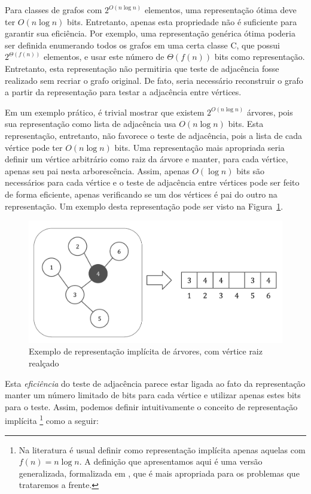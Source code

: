 Para classes de grafos com $2^{O(n\log n)}$ elementos, uma representação ótima deve ter $O(n\log n)$ bits. Entretanto, apenas esta propriedade não é suficiente para garantir sua eficiência. Por exemplo, uma representação genérica ótima poderia ser definida enumerando todos os grafos em uma certa classe C, que possui $2^{\Theta(f(n))}$ elementos, e usar este número de $\Theta(f(n))$ bits como representação. Entretanto, esta representação não permitiria que teste de adjacência fosse realizado sem recriar o grafo original. De fato, seria necessário reconstruir o grafo a partir da representação para testar a adjacência entre vértices.

Em um exemplo prático, é trivial mostrar que existem $2^{O(n\log n)}$ árvores, pois sua representação como lista de adjacência usa $O(n \log n)$ bits. Esta representação, entretanto, não favorece o teste de adjacência, pois a lista de cada vértice pode ter $O(n \log n)$ bits. Uma representação mais apropriada seria definir um vértice arbitrário como raiz da árvore e manter, para cada vértice, apenas seu pai nesta arborescência. Assim, apenas $O(\log n)$ bits são necessários para cada vértice e o teste de adjacência entre vértices pode ser feito de forma eficiente, apenas verificando se um dos vértices é pai do outro na representação. Um exemplo desta representação pode ser visto na Figura~\ref{fig:graphs1}. 

\begin{figure}[!htbp]
  \centering
  \includegraphics[scale=0.6]{files/graphs1.pdf}
  \caption{Exemplo de representação implícita de árvores, com vértice raiz realçado}
  \label{fig:graphs1}
\end{figure}

Esta \emph{eficiência} do teste de adjacência parece estar ligada ao fato da representação manter um número limitado de bits para cada vértice e utilizar apenas estes bits para o teste. Assim, podemos definir intuitivamente o conceito de representação implícita \footnote{Na literatura é usual definir como representação implícita apenas aquelas com $f(n) = n \log n$. A definição que apresentamos aqui é uma versão generalizada, formalizada em \cite{spinrad2003efficient}, que é mais apropriada para os problemas que trataremos a frente.} como a seguir:


